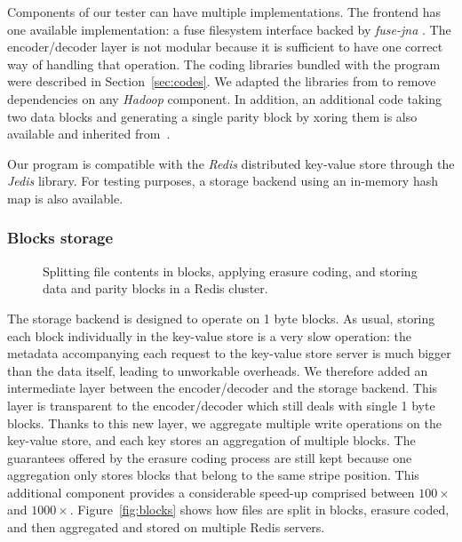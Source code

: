 Components of our tester can have multiple implementations. The frontend has one available implementation: a \ac{fuse} filesystem interface backed by \textit{fuse-jna} \autocite{fuse-jna}.
The encoder/decoder layer is not modular because it is sufficient to have one correct way of handling that operation. The coding libraries bundled with the program were described in Section~\ref{sec:codes}. We adapted the libraries from \autocite{XorbasVLDB} to remove dependencies on any \textit{Hadoop} component. In addition, an additional code taking two data blocks and generating a single parity block by xoring them is also available and inherited from~\autocite{XorbasVLDB}.

Our program is compatible with the \textit{Redis} distributed key-value store through the \textit{Jedis} library. For testing purposes, a storage backend using an in-memory hash map is also available.

\subsubsection{Blocks storage}

\begin{figure}[H]
    \centering
    
    \caption{Splitting file contents in blocks, applying erasure coding, and storing data and parity blocks in a Redis cluster.}
    \label{fig:blocks}
\end{figure}

The storage backend is designed to operate on 1 byte blocks. 
As usual, storing each block individually in the key-value store is a very slow operation: the metadata accompanying each request to the key-value store server is much bigger than the data itself, leading to unworkable overheads. We therefore added an intermediate layer between the encoder/decoder and the storage backend. This layer is transparent to the encoder/decoder which still deals with single 1 byte blocks. Thanks to this new layer, we aggregate multiple write operations on the key-value store, and each key stores an aggregation of multiple blocks.
The guarantees offered by the erasure coding process are still kept because one aggregation only stores blocks that belong to the same stripe position. This additional component provides a considerable speed-up comprised between $100\times$ and $1000\times$. Figure~\autoref{fig:blocks} shows how files are split in blocks, erasure coded, and then aggregated and stored on multiple Redis servers. 

